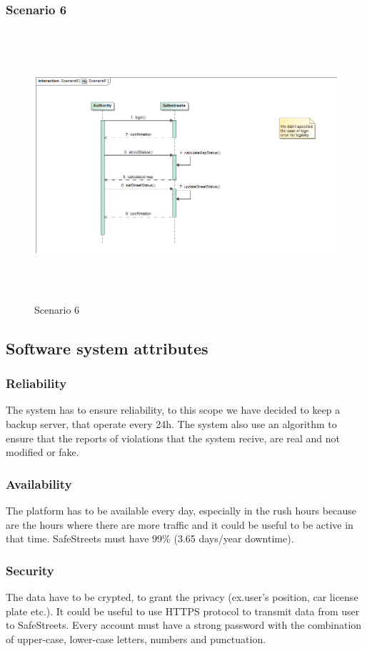 \subsubsection{Scenario 6}
\begin{figure}[H]
	\begin{minipage}[b]{0.40\textwidth}
		\includegraphics[width=15cm,height=10cm]{Images/SequenceRASD/Scenario6.png}
		\caption{Scenario 6}
	\end{minipage}
\end{figure}

\subsection{Software system attributes}
\subsubsection{Reliability}
The system has to ensure reliability, to this scope we have decided to keep a backup server, that operate every 24h.
The system also use an algorithm to ensure that the reports of violations that the system recive, are real and not modified or fake.
\subsubsection{Availability}
The platform has to be available every day, especially in the rush hours because are the hours where there are more traffic and it could be useful to be active in that time. SafeStreets must have 99\% (3.65 days/year downtime).
\subsubsection{Security}
The data have to be crypted, to grant the privacy (ex.user's position, car license plate etc.). It could be useful to use HTTPS protocol to transmit data from user to SafeStreets.
Every account must have a strong password with the combination of upper-case, lower-case letters, numbers and punctuation.
